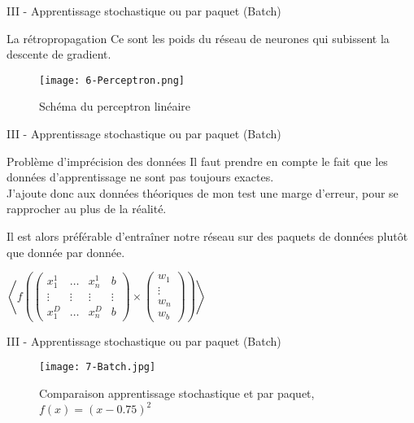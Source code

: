 \begin{frame}{III - Apprentissage stochastique ou par paquet (Batch)}
    \begin{block}{La rétropropagation}
        Ce sont les poids du réseau de neurones qui subissent la descente de gradient.
    \end{block}
    \begin{figure}
        \centering
        \texttt{[image: 6-Perceptron.png]}
        \caption{Schéma du perceptron linéaire}
    \end{figure}
    
\end{frame}


\begin{frame}{III - Apprentissage stochastique ou par paquet (Batch)}
    \begin{exampleblock}{Problème d'imprécision des données}
        Il faut prendre en compte le fait que les données d'apprentissage ne sont pas toujours exactes. \\
        J'ajoute donc aux données théoriques de mon test une marge d'erreur, pour se rapprocher au plus de la réalité. 
    \end{exampleblock}
    \begin{block}{}
        Il est alors préférable d'entraîner notre réseau sur des paquets de données plutôt que donnée par donnée. 
    \end{block}
    \begin{center}
        \centering
        $
            \left< f
            \left(
            \begin{pmatrix}
                    x_1^{1} & \ldots & x_n^{1} & b      \\
                    \vdots  & \vdots & \vdots  & \vdots \\
                    x_1^{D} & \ldots & x_n^{D} & b
                \end{pmatrix}
            \times
            \begin{pmatrix}
                    w_1    \\
                    \vdots \\
                    w_n    \\
                    w_b
                \end{pmatrix}
            \right) \right>
        $
    \end{center}
\end{frame}


\begin{frame}{III - Apprentissage stochastique ou par paquet (Batch)}
    \begin{figure}
        \centering
        \texttt{[image: 7-Batch.jpg]}
        \caption{Comparaison apprentissage stochastique et par paquet, $f(x) = (x-0.75)^2$}
    \end{figure}
\end{frame}
